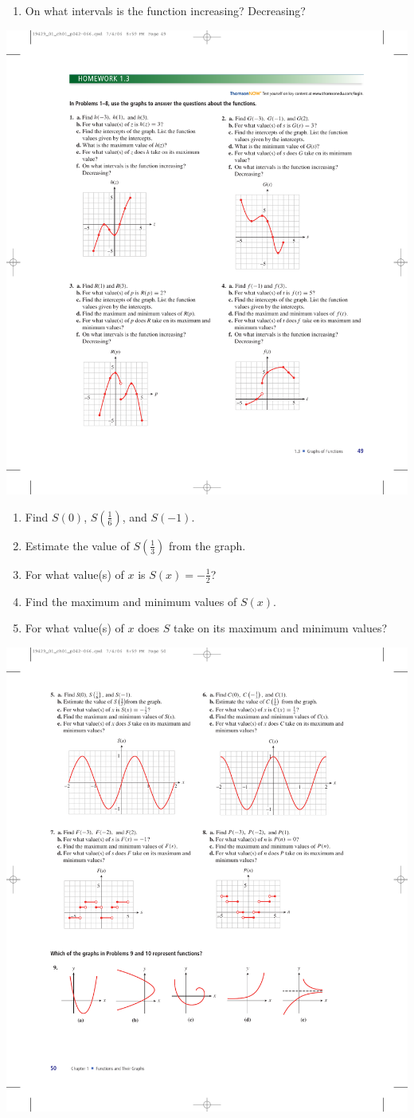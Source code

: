 \documentclass[10pt,]{book}
\theoremstyle{plain}
\theoremstyle{definition}
\theoremstyle{definition}
\theoremstyle{definition}
\theoremstyle{definition}
\numberwithin{equation}{part}
\begin{document}
\begin{exercisegroup}
\begin{enumerate}[label=*\alph**]
\item\hypertarget{li-686}{}On what intervals is the function increasing? Decreasing?%
\end{enumerate}
 \includegraphics[width=0.5\linewidth]{images/fig-ex-1-3-4}
%
\exercise[5.]\hypertarget{exercise-162}{}\leavevmode%
\begin{enumerate}[label=*\alph**]
\item\hypertarget{li-687}{}Find \(S(0)\), \(S\left(\frac{1}{6}\right)\), and \(S(-1)\).%
\item\hypertarget{li-688}{}Estimate the value of \(S\left(\frac{1}{3}\right)\) from the graph.%
\item\hypertarget{li-689}{}For what value(s) of \(x\) is \(S(x) = -\frac{1}{2}\)?%
\item\hypertarget{li-690}{}Find the maximum and minimum values of \(S(x)\).%
\item\hypertarget{li-691}{}For what value(s) of \(x\) does \(S\) take on its maximum and minimum values?%
\end{enumerate}
 \includegraphics[width=0.6\linewidth]{images/fig-ex-1-3-5}

\end{exercisegroup}
\end{document}

